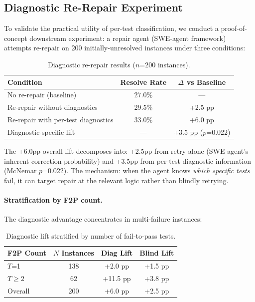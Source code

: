 \documentclass[11pt]{article}
\begin{document}
\subsection{Diagnostic Re-Repair Experiment}
\label{sec:rerepair}

To validate the practical utility of per-test classification, we conduct a proof-of-concept downstream experiment: a repair agent (SWE-agent framework) attempts re-repair on 200 initially-unresolved instances under three conditions:

\begin{table}[h]
\centering
\caption{Diagnostic re-repair results ($n$=200 instances).}
\label{tab:rerepair}
\begin{tabular}{lcc}
\toprule
Condition & Resolve Rate & $\Delta$ vs Baseline \\
\midrule
No re-repair (baseline) & 27.0\% & --- \\
Re-repair without diagnostics & 29.5\% & +2.5 pp \\
Re-repair with per-test diagnostics & 33.0\% & +6.0 pp \\
\midrule
Diagnostic-specific lift & --- & +3.5 pp ($p$=0.022) \\
\bottomrule
\end{tabular}
\end{table}

The +6.0pp overall lift decomposes into: +2.5pp from retry alone (SWE-agent's inherent correction probability) and +3.5pp from per-test diagnostic information (McNemar $p$=0.022). The mechanism: when the agent knows \emph{which specific tests} fail, it can target repair at the relevant logic rather than blindly retrying.

\paragraph{Stratification by F2P count.} The diagnostic advantage concentrates in multi-failure instances:

\begin{table}[h]
\centering
\caption{Diagnostic lift stratified by number of fail-to-pass tests.}
\label{tab:rerepair-stratified}
\begin{tabular}{lccc}
\toprule
F2P Count & $N$ Instances & Diag Lift & Blind Lift \\
\midrule
$T$=1 & 138 & +2.0 pp & +1.5 pp \\
$T \geq 2$ & 62 & +11.5 pp & +3.8 pp \\
\midrule
Overall & 200 & +6.0 pp & +2.5 pp \\
\bottomrule
\end{tabular}
\end{table}
\end{document}
